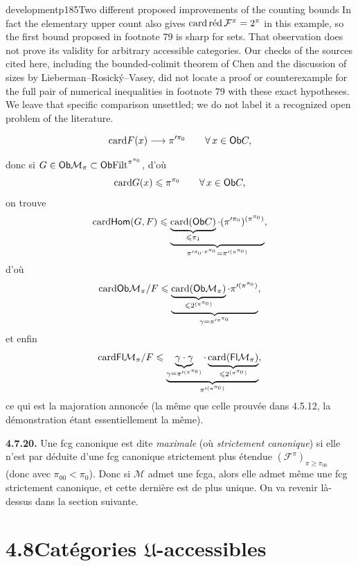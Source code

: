 \begin{dcomment}{development}{p185}{Two different proposed improvements of the counting bounds}
In fact the elementary upper count also gives $\cardred\mathcal F^\pi=2^\pi$ in this example, so the first bound proposed in footnote 79 is sharp for sets. That observation does not prove its validity for arbitrary accessible categories. Our checks of the sources cited here, including the bounded-colimit theorem of Chen and the discussion of sizes by Lieberman--Rosick\'y--Vasey, did not locate a proof or counterexample for the full pair of numerical inequalities in footnote 79 with these exact hypotheses. We leave that specific comparison unsettled; we do not label it a recognized open problem of the literature.
\end{dcomment}


\[ \card F(x) \longrightarrow \pi'^{\pi_0} \qquad \forall\, x \in \Ob C , \] %

donc si $G \in \Ob \mathcal{M}_\pi \subset \Ob \Filt^{\pi^{\pi_0}}$, d'où
\[ \card G(x) \leqslant \pi^{\pi_0} \qquad \forall\, x \in \Ob C , \]
on trouve
\[ \card \Hom(G,F) \leqslant \underbrace{\underbrace{\card(\Ob C)}_{\leqslant \pi_1}\cdot(\pi'^{\pi_0})^{(\pi^{\pi_0})}}_{\pi'^{\pi_0\cdot\pi^{\pi_0}} = \pi'^{(\pi^{\pi_0})}} , \]
d'où
\[ \card \Ob \mathcal{M}_\pi/F \leqslant \underbrace{\underbrace{\card(\Ob \mathcal{M}_\pi)}_{\leqslant 2^{(\pi^{\pi_0})}}\cdot\pi'^{(\pi^{\pi_0})}}_{\gamma = \pi'^{\pi^{\pi_0}}} , \]
et enfin
\[ \card \Fl \mathcal{M}_\pi/F \leqslant \underbrace{\underbrace{\gamma\cdot\gamma}_{\gamma = \pi'^{(\pi^{\pi_0})}}\cdot\underbrace{\card(\Fl \mathcal{M}_\pi)}_{\leqslant 2^{(\pi^{\pi_0})}}}_{\pi'^{(\pi^{\pi_0})}} , \]
ce qui est la majoration annoncée (la même que celle prouvée dans 4.5.12, la démonstration étant essentiellement la même).


\textbf{4.7.20.} Une fcg canonique est dite \textit{maximale} (où \textit{strictement canonique}) si elle n'est par déduite d'une fcg canonique strictement plus étendue $(\mathcal{F}^\pi)_{\pi\geqslant\pi_{00}}$ (donc avec $\pi_{00} < \pi_0$). Donc si $\mathcal{M}$ admet une fcga, alors elle admet même une fcg strictement canonique, et cette dernière est de plus unique. On va revenir là-dessus dans la section suivante. %

\section*{4.8\quad Catégories $\mathfrak{U}$-accessibles}

